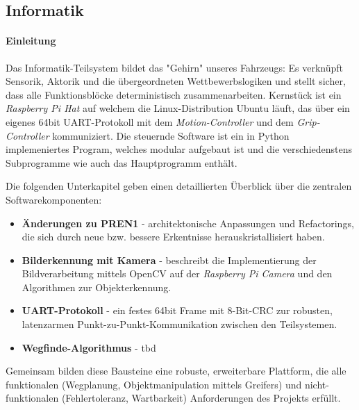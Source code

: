 \documentclass[main.tex]{subfiles} %
\begin{document}
\subsection{Informatik}

\paragraph{Einleitung}

Das Informatik-Teilsystem bildet das "Gehirn" unseres Fahrzeugs:
Es verknüpft Sensorik, Aktorik und die übergeordneten
Wettbewerbslogiken und stellt sicher, dass alle Funktionsblöcke
deterministisch zusammenarbeiten.
Kernstück ist ein \emph{Raspberry Pi Hat} auf welchem die
Linux-Distribution Ubuntu läuft, das über ein
eigenes 64bit UART-Protokoll mit dem \emph{Motion-Controller}
und dem \emph{Grip-Controller} kommuniziert.
Die steuernde Software ist ein in Python implemeniertes Program, welches modular
aufgebaut ist und die verschiedenstens Subprogramme wie auch das
Hauptprogramm enthält.

Die folgenden Unterkapitel geben einen detaillierten Überblick über
die zentralen Softwarekomponenten:

\begin{itemize}\setlength\itemsep{0.3em}
  \item \textbf{Änderungen zu PREN1} - architektonische Anpassungen
    und Refactorings, die sich durch neue bzw. bessere Erkentnisse
    herauskristallisiert haben.
  \item \textbf{Bilderkennung mit Kamera} - beschreibt die Implementierung
    der Bildverarbeitung mittels OpenCV auf der \emph{Raspberry Pi
    Camera} und den Algorithmen zur Objekterkennung.
  \item \textbf{UART-Protokoll} - ein festes 64bit Frame mit
    8-Bit-CRC zur robusten, latenzarmen Punkt-zu-Punkt-Kommunikation
    zwischen den Teilsystemen.
  \item \textbf{Wegfinde-Algorithmus} - tbd
\end{itemize}

Gemeinsam bilden diese Bausteine eine robuste, erweiterbare
Plattform, die alle funktionalen (Wegplanung, Objektmanipulation
mittels Greifers) und
nicht-funktionalen (Fehlertoleranz, Wartbarkeit)
Anforderungen des Projekts erfüllt.


\newpage


\newpage


\newpage


\newpage
\end{document}
